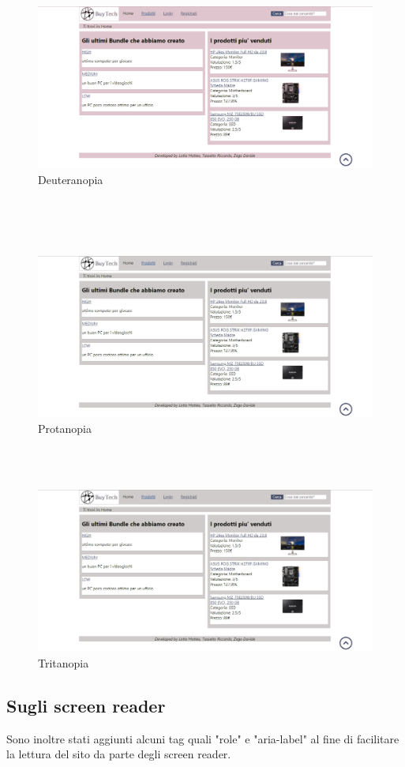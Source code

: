 \begin{figure}[h]
	\label{deuteranopia}
	\centering %
	\includegraphics[width=1\textwidth]{immagini/homedeute.png}
	\caption{Deuteranopia} %
\end{figure}\mbox{} \\

\mbox{} \\ \mbox{} \\ \Spazio
\newline
\begin{figure}[h]
	\label{protanopia}
	\centering %
	\includegraphics[width=1\textwidth]{immagini/homeprota.png}
	\caption{Protanopia} %
\end{figure}

\mbox{} \\ \mbox{} \\ \Spazio
\newline
\begin{figure}[h]
	\label{tritanopia}
	\centering %
	\includegraphics[width=1\textwidth]{immagini/hometrita.png}
	\caption{Tritanopia} %
\end{figure}
\newline

\subsection{Sugli screen reader}
Sono inoltre stati aggiunti alcuni tag quali "role" e "aria-label" al fine di facilitare la lettura del sito da parte degli screen reader.
